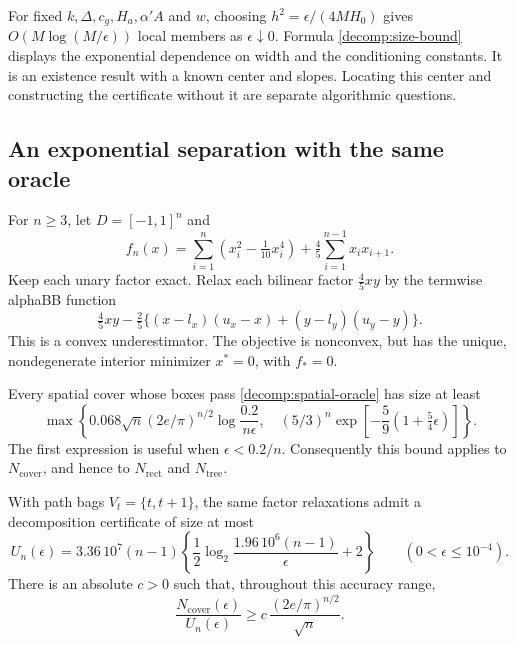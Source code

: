 For fixed $k,\Delta,c_g,H_a,\alpha'A$ and $w$, choosing
$h^2=\epsilon/(4MH_0)$ gives $O(M\log(M/\epsilon))$ local members as
$\epsilon\downarrow0$. Formula \eqref{decomp:size-bound} displays the
exponential dependence on width and the conditioning constants. It is an
existence result with a known center and slopes. Locating this center and
constructing the certificate without it are separate algorithmic questions.

\subsection{An exponential separation with the same oracle}

\begin{theorem}\label{decomp:path-separation}
For $n\ge3$, let $D=[-1,1]^n$ and
\begin{equation}\label{decomp:path-objective}
 f_n(x)=\sum_{i=1}^n(x_i^2-\tfrac1{10}x_i^4)
            +\tfrac45\sum_{i=1}^{n-1}x_ix_{i+1}.
\end{equation}
Keep each unary factor exact. Relax each bilinear factor $\tfrac45xy$ by
the termwise alphaBB function
\[
 \tfrac45xy-\tfrac25\{(x-l_x)(u_x-x)+(y-l_y)(u_y-y)\}.
\]
This is a convex underestimator. The objective is nonconvex, but has the
unique, nondegenerate interior minimizer $x^*=0$, with $f_*=0$.

Every spatial cover whose boxes pass \eqref{decomp:spatial-oracle} has size
at least
\begin{equation}\label{decomp:path-lower}
 \max\left\{
 0.068\sqrt n(2e/\pi)^{n/2}\log\frac{0.2}{n\epsilon},\quad
 (5/3)^n\exp\left[-\frac59(1+\tfrac54\epsilon)\right]
 \right\}.
\end{equation}
The first expression is useful when $\epsilon<0.2/n$.
Consequently this bound applies to $N_{\mathrm{cover}}$, and hence to
$N_{\mathrm{rect}}$ and $N_{\mathrm{tree}}$.

With path bags $V_t=\{t,t+1\}$, the same factor relaxations admit a
decomposition certificate of size at most
\begin{equation}\label{decomp:path-upper}
 U_n(\epsilon)=3.36\,10^7(n-1)
 \left\{\frac12\log_2\frac{1.96\,10^6(n-1)}{\epsilon}+2\right\}
 \qquad(0<\epsilon\le10^{-4}).
\end{equation}
There is an absolute $c>0$ such that, throughout this accuracy range,
\begin{equation}\label{decomp:uniform-ratio}
 \frac{N_{\mathrm{cover}}(\epsilon)}{U_n(\epsilon)}
       \ge c\,\frac{(2e/\pi)^{n/2}}{\sqrt n}.
\end{equation}
\end{theorem}

